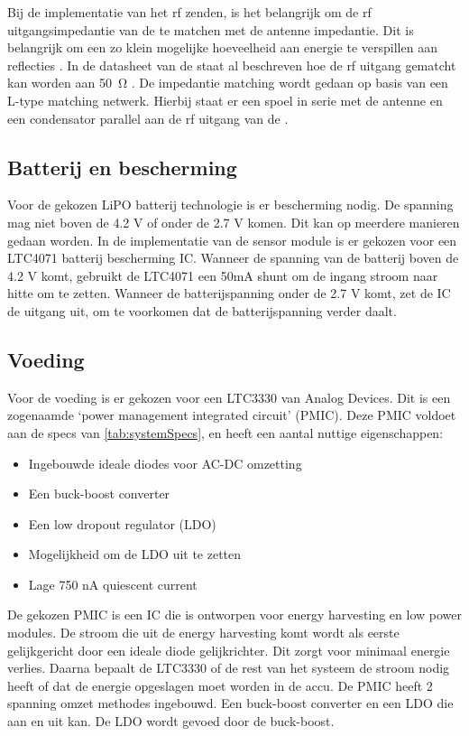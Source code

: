 Bij de implementatie van het rf zenden, is het belangrijk om de rf uitgangsimpedantie van de \mcu te matchen met de antenne impedantie. Dit is belangrijk om een zo klein mogelijke hoeveelheid aan energie te verspillen aan reflecties \cite{FundamentalsofAppliedElectromagnetics}. In de datasheet van de \mcu staat al beschreven hoe de rf uitgang gematcht kan worden aan \qty{50}{\ohm} \cite{dsNrf52810}. De impedantie matching wordt gedaan op basis van een L-type matching netwerk. Hierbij staat er een spoel in serie met de antenne en een condensator parallel aan de rf uitgang van de \mcu \cite{dsNrf52810}.
\subsection{Batterij en bescherming}

Voor de gekozen LiPO batterij technologie is er bescherming nodig. De spanning mag niet boven de 4.2 V of onder de 2.7 V komen. Dit kan op meerdere manieren gedaan worden. In de implementatie van de sensor module is er gekozen voor een LTC4071 batterij bescherming IC. Wanneer de spanning van de batterij boven de 4.2 V komt, gebruikt de LTC4071 een 50mA shunt om de ingang stroom naar hitte om te zetten. Wanneer de batterijspanning onder de 2.7 V komt, zet de IC de uitgang uit, om te voorkomen dat de batterijspanning verder daalt.

\subsection{Voeding}
Voor de voeding is er gekozen voor een LTC3330 van Analog Devices. Dit is een zogenaamde `power management integrated circuit' (PMIC). Deze PMIC voldoet aan de specs van \cref{tab:systemSpecs}, en heeft een aantal nuttige eigenschappen:
\begin{itemize}
    \item Ingebouwde ideale diodes voor AC-DC omzetting
    \item Een buck-boost converter
    \item Een low dropout regulator (LDO)
    \item Mogelijkheid om de LDO uit te zetten
    \item Lage 750 nA quiescent current
\end{itemize}

De gekozen PMIC is een IC die is ontworpen voor energy harvesting en low power modules. De stroom die uit de energy harvesting komt wordt als eerste gelijkgericht door een ideale diode gelijkrichter. Dit zorgt voor minimaal energie verlies. Daarna bepaalt de LTC3330 of de rest van het systeem de stroom nodig heeft of dat de energie opgeslagen moet worden in de accu. De PMIC heeft 2 spanning omzet methodes ingebouwd. Een buck-boost converter en een LDO die aan en uit kan. De LDO wordt gevoed door de buck-boost. 

